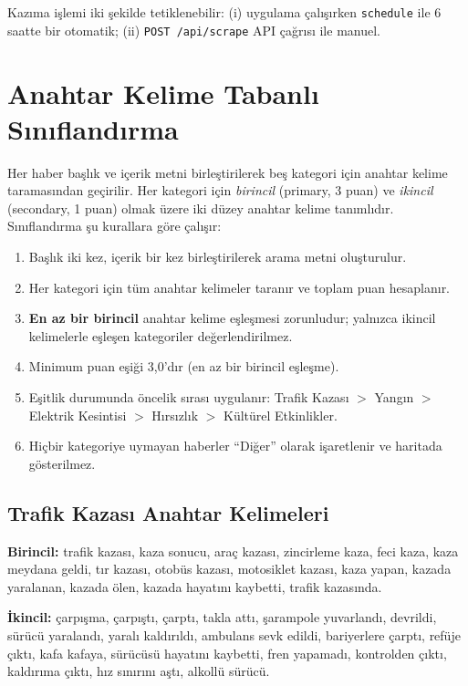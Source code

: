 \documentclass[conference,a4paper]{IEEEtran}
\begin{document}
Kazıma işlemi iki şekilde tetiklenebilir: (i) uygulama çalışırken \texttt{schedule} ile 6 saatte bir otomatik; (ii) \texttt{POST /api/scrape} API çağrısı ile manuel.

\section{Anahtar Kelime Tabanlı Sınıflandırma}
\label{sec:classification}
Her haber başlık ve içerik metni birleştirilerek beş kategori için anahtar kelime taramasından geçirilir. Her kategori için \emph{birincil} (primary, 3 puan) ve \emph{ikincil} (secondary, 1 puan) olmak üzere iki düzey anahtar kelime tanımlıdır. Sınıflandırma şu kurallara göre çalışır:

\begin{enumerate}
    \item Başlık iki kez, içerik bir kez birleştirilerek arama metni oluşturulur.
    \item Her kategori için tüm anahtar kelimeler taranır ve toplam puan hesaplanır.
    \item \textbf{En az bir birincil} anahtar kelime eşleşmesi zorunludur; yalnızca ikincil kelimelerle eşleşen kategoriler değerlendirilmez.
    \item Minimum puan eşiği 3,0'dır (en az bir birincil eşleşme).
    \item Eşitlik durumunda öncelik sırası uygulanır: Trafik Kazası $>$ Yangın $>$ Elektrik Kesintisi $>$ Hırsızlık $>$ Kültürel Etkinlikler.
    \item Hiçbir kategoriye uymayan haberler ``Diğer'' olarak işaretlenir ve haritada gösterilmez.
\end{enumerate}

\subsection{Trafik Kazası Anahtar Kelimeleri}
\textbf{Birincil:} trafik kazası, kaza sonucu, araç kazası, zincirleme kaza, feci kaza, kaza meydana geldi, tır kazası, otobüs kazası, motosiklet kazası, kaza yapan, kazada yaralanan, kazada ölen, kazada hayatını kaybetti, trafik kazasında.

\textbf{İkincil:} çarpışma, çarpıştı, çarptı, takla attı, şarampole yuvarlandı, devrildi, sürücü yaralandı, yaralı kaldırıldı, ambulans sevk edildi, bariyerlere çarptı, refüje çıktı, kafa kafaya, sürücüsü hayatını kaybetti, fren yapamadı, kontrolden çıktı, kaldırıma çıktı, hız sınırını aştı, alkollü sürücü.
\end{document}
